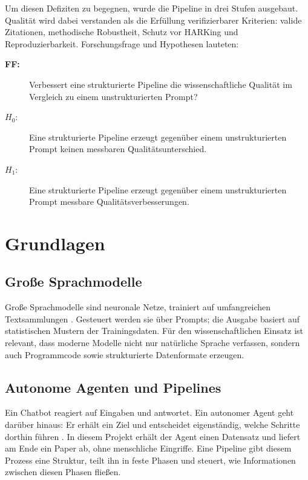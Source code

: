 \documentclass[11pt,a4paper]{article}
\begin{document}
Um diesen Defiziten zu begegnen, wurde die Pipeline in drei Stufen ausgebaut. Qualität wird dabei verstanden als die Erfüllung verifizierbarer Kriterien:
valide Zitationen, methodische Robustheit, Schutz vor HARKing und Reproduzierbarkeit. Forschungsfrage und Hypothesen lauteten:

\begin{description}
  \item[\textbf{FF:}] Verbessert eine strukturierte Pipeline die wissenschaftliche
    Qualität im Vergleich zu einem unstrukturierten Prompt?
  \item[$H_0$:] Eine strukturierte Pipeline erzeugt gegenüber einem unstrukturierten Prompt keinen messbaren Qualitätsunterschied.
  \item[$H_1$:] Eine strukturierte Pipeline erzeugt gegenüber einem unstrukturierten Prompt messbare Qualitätsverbesserungen.
\end{description}

\section{Grundlagen}

\subsection{Große Sprachmodelle}

Große Sprachmodelle sind neuronale Netze, trainiert auf umfangreichen Textsammlungen
\cite{brown2020gpt3}. Gesteuert werden sie über Prompts; die Ausgabe basiert auf
statistischen Mustern der Trainingsdaten. Für den wissenschaftlichen Einsatz ist relevant, dass moderne Modelle nicht nur
natürliche Sprache verfassen, sondern auch Programmcode sowie strukturierte
Datenformate erzeugen.

\subsection{Autonome Agenten und Pipelines}

Ein Chatbot reagiert auf Eingaben und antwortet. Ein autonomer Agent geht darüber
hinaus: Er erhält ein Ziel und entscheidet eigenständig, welche Schritte dorthin
führen \cite{lu2024aiscientist, schmidgall2025agentlab}. In diesem Projekt erhält
der Agent einen Datensatz und liefert am Ende ein Paper ab, ohne menschliche
Eingriffe. Eine Pipeline gibt diesem Prozess eine Struktur, teilt ihn in feste
Phasen und steuert,
wie Informationen zwischen diesen Phasen fließen.
\end{document}
